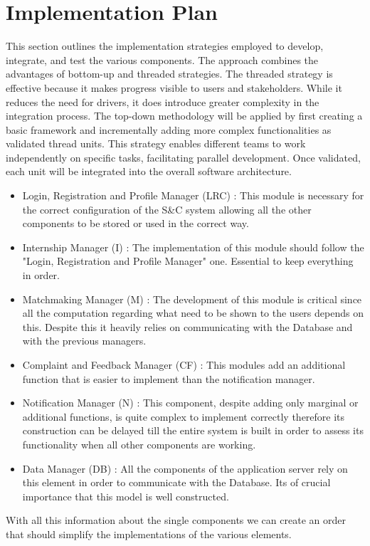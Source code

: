 \section{Implementation Plan}
This section outlines the implementation strategies employed to develop, integrate, and test the various components. The approach combines the advantages of bottom-up and threaded strategies.
The threaded strategy is effective because it makes progress visible to users and stakeholders. While it reduces the need for drivers, it does introduce greater complexity in the integration process.
The top-down methodology will be applied by first creating a basic framework and incrementally adding more complex functionalities as validated thread units. 
This strategy enables different teams to work independently on specific tasks, facilitating parallel development. Once validated, each unit will be integrated into the overall software architecture.
\begin{itemize}
    \item Login, Registration and Profile Manager (LRC) : This module is necessary for the correct configuration of the S\&C system allowing all the other components to be stored or used in the correct way.
    \item Internship Manager (I) : The implementation of this module should follow the "Login, Registration and Profile Manager" one. Essential to keep everything in order.
    \item Matchmaking Manager (M) : The development of this module is critical since all the computation regarding what need to be shown to the users depends on this. Despite this it heavily relies on communicating with the Database and with the previous managers.
    \item Complaint and Feedback Manager (CF) : This modules add an additional function that is easier to implement than the notification manager.
    \item Notification Manager (N) : This component, despite adding only marginal or additional functions, is quite complex to implement correctly therefore its construction can be delayed till the entire system is built in order to assess its functionality when all other components are working.
    \item Data Manager (DB) : All the components of the application server rely on this element in order to communicate with the Database. Its of crucial importance that this model is well constructed.
\end{itemize}
With all this information about the single components we can create an order that should simplify the implementations of the various elements.

